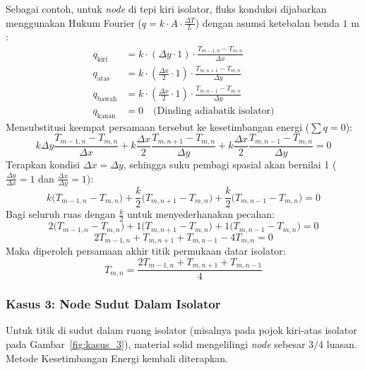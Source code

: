 \documentclass[12pt,a4paper]{article}
\begin{document}
Sebagai contoh, untuk \textit{node} di tepi kiri isolator, fluks konduksi dijabarkan menggunakan Hukum Fourier ($q = k \cdot A \cdot \frac{\Delta T}{L}$) dengan asumsi ketebalan benda $1\text{ m}$:
\begin{align*}
    q_{\text{kiri}}  &= k \cdot (\Delta y \cdot 1) \cdot \frac{T_{m-1,n} - T_{m,n}}{\Delta x} \\
    q_{\text{atas}}  &= k \cdot \left(\frac{\Delta x}{2} \cdot 1\right) \cdot \frac{T_{m,n+1} - T_{m,n}}{\Delta y} \\
    q_{\text{bawah}} &= k \cdot \left(\frac{\Delta x}{2} \cdot 1\right) \cdot \frac{T_{m,n-1} - T_{m,n}}{\Delta y} \\
    q_{\text{kanan}} &= 0 \quad \text{(Dinding adiabatik isolator)}
\end{align*}
Mensubstitusi keempat persamaan tersebut ke kesetimbangan energi ($\sum q = 0$):
\begin{equation}
    k \Delta y \frac{T_{m-1,n} - T_{m,n}}{\Delta x} + k \frac{\Delta x}{2} \frac{T_{m,n+1} - T_{m,n}}{\Delta y} + k \frac{\Delta x}{2} \frac{T_{m,n-1} - T_{m,n}}{\Delta y} = 0
\end{equation}
Terapkan kondisi $\Delta x = \Delta y$, sehingga suku pembagi spasial akan bernilai 1 ($\frac{\Delta y}{\Delta x} = 1$ dan $\frac{\Delta x}{\Delta y} = 1$):
\begin{equation}
    k \big(T_{m-1,n} - T_{m,n}\big) + \frac{k}{2} \big(T_{m,n+1} - T_{m,n}\big) + \frac{k}{2} \big(T_{m,n-1} - T_{m,n}\big) = 0
\end{equation}
Bagi seluruh ruas dengan $\frac{k}{2}$ untuk menyederhanakan pecahan:
\begin{equation}
    2 \big(T_{m-1,n} - T_{m,n}\big) + 1 \big(T_{m,n+1} - T_{m,n}\big) + 1 \big(T_{m,n-1} - T_{m,n}\big) = 0
\end{equation}
\begin{equation}
    2T_{m-1,n} + T_{m,n+1} + T_{m,n-1} - 4T_{m,n} = 0
\end{equation}
Maka diperoleh persamaan akhir titik permukaan datar isolator:
\begin{equation} \label{eq:insulator_flat_final}
    T_{m,n} = \frac{2T_{m-1,n} + T_{m,n+1} + T_{m,n-1}}{4}
\end{equation}

\subsubsection*{Kasus 3: Node Sudut Dalam Isolator}
Untuk titik di sudut dalam ruang isolator (misalnya pada pojok kiri-atas isolator pada Gambar~\ref{fig:kasus_3}), material solid mengelilingi \textit{node} sebesar $3/4$ luasan. Metode Kesetimbangan Energi kembali diterapkan.
\end{document}
